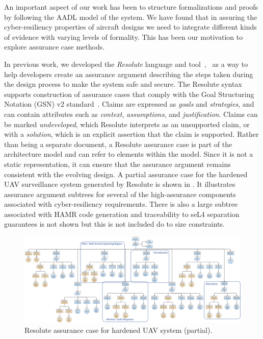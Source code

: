 An important aspect of our work has been to structure formalizations and proofs by following
the AADL model of the system. 
We have found that in assuring the cyber-resiliency properties of aircraft designs we need to integrate
different kinds of evidence with varying levels of formality. This has been our motivation to
explore assurance case methods.

In previous work, we developed the {\em Resolute} language and
tool~\cite{resolute2014},~\cite{resolute-destion} as a way to help developers create an assurance
argument describing the steps taken during the design process to make the system safe and secure.
The Resolute syntax supports construction of assurance cases that comply with the Goal Structuring
Notation (GSN) v2 standard~\cite{GSNv2}. Claims are expressed as \textit{goals} and
\textit{strategies}, and can contain attributes such as \textit{context}, \textit{assumptions}, and
\textit{justification}. Claims can be marked \textit{undeveloped}, which Resolute interprets as an
unsupported claim, or with a \textit{solution}, which is an explicit assertion that the claim is
supported. Rather than being a separate document, a Resolute assurance case is part of the
architecture model and can refer to elements within the model. Since it is not a static
representation, it can ensure that the assurance argument remains consistent with the evolving
design.  A partial assurance case for the hardened UAV surveillance system generated by Resolute 
is shown in .  It illustrates assurance argument subtrees for several of
the high-assurance components associated with cyber-resiliency requirements.  There is also a large subtree associated
with HAMR code generation and traceability to seL4 separation guarantees is not shown but this is not
included do to size constraints.  

\begin{figure} 
\centering 
\includegraphics[width=\textwidth]{figs/assurance-case.png}
\caption{Resolute assurance case for hardened UAV system (partial).}
\label{fig:assurance-case} 
\end{figure}

